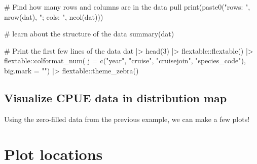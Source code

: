 \documentclass[
  letterpaper,
  oneside,
  open=any]{scrbook}
\newenvironment{Shaded}{\begin{snugshade}}{\end{snugshade}}
\newcommand{\AttributeTok}[1]{\textcolor[rgb]{0.40,0.45,0.13}{#1}}
\newcommand{\CommentTok}[1]{\textcolor[rgb]{0.37,0.37,0.37}{#1}}
\newcommand{\DecValTok}[1]{\textcolor[rgb]{0.68,0.00,0.00}{#1}}
\newcommand{\FunctionTok}[1]{\textcolor[rgb]{0.28,0.35,0.67}{#1}}
\newcommand{\NormalTok}[1]{\textcolor[rgb]{0.00,0.23,0.31}{#1}}
\newcommand{\SpecialCharTok}[1]{\textcolor[rgb]{0.37,0.37,0.37}{#1}}
\newcommand{\StringTok}[1]{\textcolor[rgb]{0.13,0.47,0.30}{#1}}
\begin{document}
\begin{Shaded}
\begin{Highlighting}[]
\CommentTok{\# Find how many rows and columns are in the data pull}
\FunctionTok{print}\NormalTok{(}\FunctionTok{paste0}\NormalTok{(}\StringTok{"rows: "}\NormalTok{, }\FunctionTok{nrow}\NormalTok{(dat), }\StringTok{"; cols: "}\NormalTok{, }\FunctionTok{ncol}\NormalTok{(dat)))}

\CommentTok{\# learn about the structure of the data}
\FunctionTok{summary}\NormalTok{(dat)}

\CommentTok{\# Print the first few lines of the data }
\NormalTok{dat }\SpecialCharTok{|\textgreater{}} 
  \FunctionTok{head}\NormalTok{(}\DecValTok{3}\NormalTok{) }\SpecialCharTok{|\textgreater{}} 
\NormalTok{  flextable}\SpecialCharTok{::}\FunctionTok{flextable}\NormalTok{() }\SpecialCharTok{|\textgreater{}}
\NormalTok{  flextable}\SpecialCharTok{::}\FunctionTok{colformat\_num}\NormalTok{(}
      \AttributeTok{j =} \FunctionTok{c}\NormalTok{(}\StringTok{"year"}\NormalTok{, }\StringTok{"cruise"}\NormalTok{, }\StringTok{"cruisejoin"}\NormalTok{, }\StringTok{"species\_code"}\NormalTok{), }
      \AttributeTok{big.mark =} \StringTok{""}\NormalTok{) }\SpecialCharTok{|\textgreater{}} 
\NormalTok{  flextable}\SpecialCharTok{::}\FunctionTok{theme\_zebra}\NormalTok{()}
\end{Highlighting}
\end{Shaded}

\subsection{Visualize CPUE data in distribution
map}\label{visualize-cpue-data-in-distribution-map}

Using the zero-filled data from the previous example, we can make a few
plots!

\section{Plot locations}\label{plot-locations}
\end{document}
